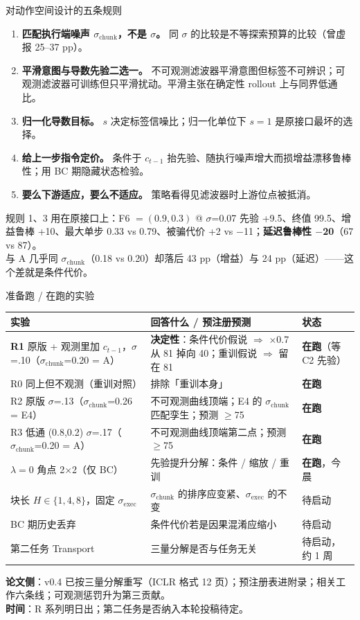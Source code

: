 \documentclass[10pt,aspectratio=169]{beamer}
\newcommand{\hl}[1]{\textcolor{good}{\textbf{#1}}}
\newcommand{\ba}[1]{\textcolor{bad}{\textbf{#1}}}
\newcommand{\sexec}{\sigma_{\mathrm{exec}}}
\newcommand{\schunk}{\sigma_{\mathrm{chunk}}}
\begin{document}
\begin{frame}{对动作空间设计的五条规则}
\begin{enumerate}
\item \textbf{匹配执行端噪声 $\schunk$，不是 $\sigma$。} 同 $\sigma$ 的比较是不等探索预算的比较（曾虚报 25–37 pp）。
\item \textbf{平滑意图与导数先验二选一。} 不可观测滤波器平滑意图但标签不可辨识；可观测滤波器可训练但只平滑扰动。平滑主张在确定性 rollout 上与同界低通比。
\item \textbf{归一化导数目标。} $s$ 决定标签信噪比；归一化单位下 $s=1$ 是原接口最坏的选择。
\item \textbf{给上一步指令定价。} 条件于 $c_{t-1}$ 抬先验、随执行噪声增大而损增益漂移鲁棒性；用 BC 期隐藏状态检验。
\item \textbf{要么下游适应，要么不适应。} 策略看得见滤波器时上游位点被抵消。
\end{enumerate}
\begin{block}{规则 1、3 用在原接口上：F6 $=(0.9,0.3)$ @ $\sigma$=0.07}
先验 +9.5、终值 99.5、增益鲁棒 +10、最大单步 0.33 vs 0.79、被骗代价 +2 vs $-$11；\ba{延迟鲁棒性 $-$20}（67 vs 87）。\\
与 A 几乎同 $\schunk$（0.18 vs 0.20）却落后 43 pp（增益）与 24 pp（延迟）——这个差就是条件代价。
\end{block}
\end{frame}

\begin{frame}{准备跑 / 在跑的实验}
\begin{tabular}{p{} p{} p{}}
\toprule
\textbf{实验} & \textbf{回答什么 / 预注册预测} & \textbf{状态} \\
\midrule
\textbf{R1} 原版 + 观测里加 $c_{t-1}$，$\sigma$=.10（$\schunk$=0.20 = A） & \textbf{决定性}：条件代价假说 $\Rightarrow$ ×0.7 从 81 掉向 40；重训假说 $\Rightarrow$ 留在 81 & \hl{在跑}（等 C2 先验） \\
R0 同上但不观测（重训对照） & 排除「重训本身」 & \hl{在跑} \\
R2 原版 $\sigma$=.13（$\schunk$=0.26 = E4） & 不可观测曲线顶端；E4 的 $\schunk$ 匹配孪生；预测 $\ge$75 & \hl{在跑} \\
R3 低通 (0.8,0.2) $\sigma$=.17（$\schunk$=0.20 = A） & 不可观测曲线顶端第二点；预测 $\ge$75 & \hl{在跑} \\
$\lambda=0$ 角点 2$\times$2（仅 BC） & 先验提升分解：条件 / 缩放 / 重训 & \hl{在跑}，今晨 \\
块长 $H\in\{1,4,8\}$，固定 $\sexec$ & $\schunk$ 的排序应变紧、$\sexec$ 的不变 & 待启动 \\
BC 期历史丢弃 & 条件代价若是因果混淆应缩小 & 待启动 \\
第二任务 Transport & 三量分解是否与任务无关 & 待启动，约 1 周 \\
\bottomrule
\end{tabular}
\vspace{2mm}

\textbf{论文侧}：v0.4 已按三量分解重写（ICLR 格式 12 页）；预注册表进附录；相关工作六条线；可观测惩罚升为第三贡献。\\
\textbf{时间}：R 系列明日出；第二任务是否纳入本轮投稿待定。
\end{frame}
\end{document}

